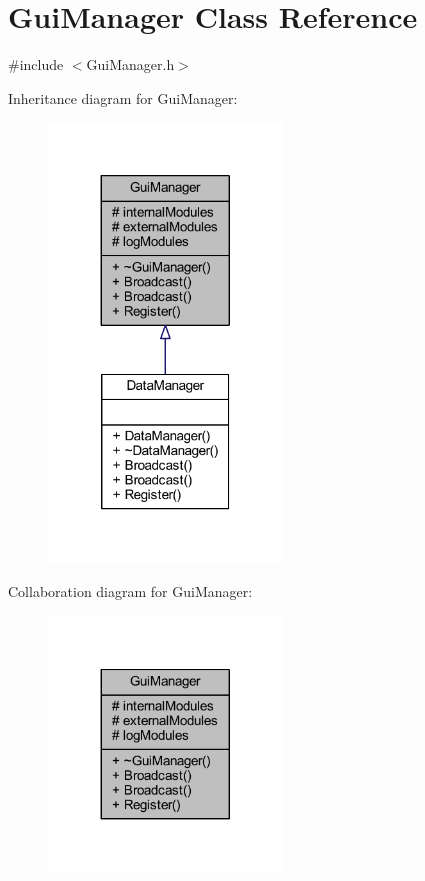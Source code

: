 \hypertarget{class_gui_manager}{}\section{Gui\+Manager Class Reference}
\label{class_gui_manager}


{\ttfamily \#include $<$Gui\+Manager.\+h$>$}



Inheritance diagram for Gui\+Manager\+:\nopagebreak
\begin{figure}[H]
\begin{center}
\leavevmode
\includegraphics[width=176pt]{class_gui_manager__inherit__graph}
\end{center}
\end{figure}


Collaboration diagram for Gui\+Manager\+:\nopagebreak
\begin{figure}[H]
\begin{center}
\leavevmode
\includegraphics[width=176pt]{class_gui_manager__coll__graph}
\end{center}
\end{figure}
